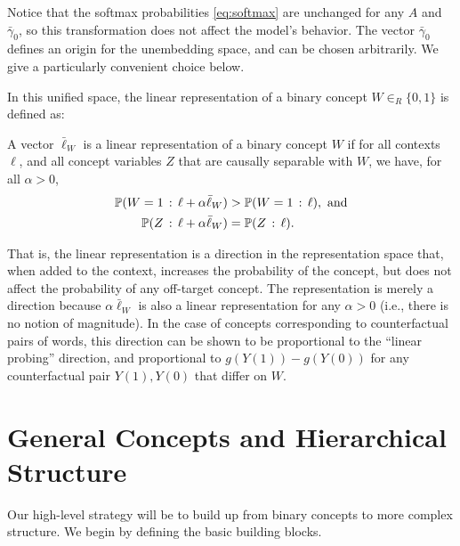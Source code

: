 \documentclass{article}
\begin{document}
Notice that the softmax probabilities \cref{eq:softmax} are unchanged for any $A$ and $\bar{\gamma}_0$, so this transformation does not affect the model's behavior. The vector $\bar{\gamma}_0$ defines an origin for the unembedding space, and can be chosen arbitrarily. We give a particularly convenient choice below.

In this unified space, the linear representation of a binary concept $W\in_R \{0, 1\}$ is defined as:
\begin{definition}\label{def:linear_representation_orig}
  A vector $\bar{\ell}_W$ is a linear representation of a binary concept $W$ if for all contexts $\ell$, and all concept variables $Z$ that are causally separable with $W$, we have, for all $\alpha>0$,
  \begin{align}
    \Pr(W = 1 \given \ell + \alpha \bar{\ell}_W) &> \Pr(W = 1 \given \ell), \text{ and} \\
    \Pr(Z \given \ell + \alpha \bar{\ell}_W) &= \Pr(Z\given \ell).
  \end{align} 
\end{definition}
That is, the linear representation is a direction in the representation space that, when added to the context, increases the probability of the concept, but does not affect the probability of any off-target concept.
The representation is merely a direction because $\alpha \bar{\ell}_W$ is also a linear representation for any $\alpha>0$ (i.e., there is no notion of magnitude).
In the case of concepts corresponding to counterfactual pairs of words, this direction can be shown to be proportional to the ``linear probing'' direction, and proportional to $g(Y(1)) - g(Y(0))$ for any counterfactual pair $Y(1), Y(0)$ that differ on $W$.



\section{General Concepts and Hierarchical Structure}
Our high-level strategy will be to build up from binary concepts to more complex structure. We begin by defining the basic building blocks.
\end{document}
